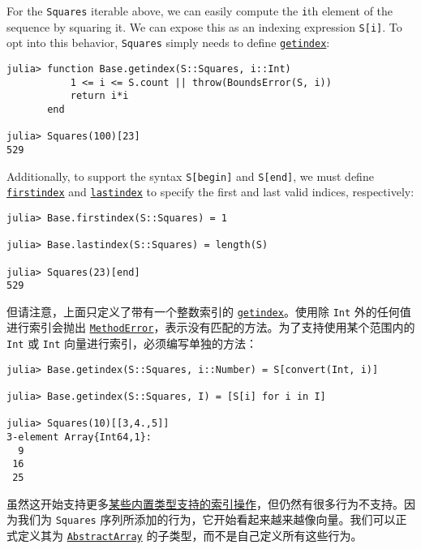 For the \texttt{Squares} iterable above, we can easily compute the \texttt{i}th element of the sequence by squaring it.  We can expose this as an indexing expression \texttt{S[i]}. To opt into this behavior, \texttt{Squares} simply needs to define \hyperlink{13720608614876840481}{\texttt{getindex}}:




\begin{verbatim}
julia> function Base.getindex(S::Squares, i::Int)
           1 <= i <= S.count || throw(BoundsError(S, i))
           return i*i
       end

julia> Squares(100)[23]
529
\end{verbatim}



Additionally, to support the syntax \texttt{S[begin]} and \texttt{S[end]}, we must define \hyperlink{16943669671291374223}{\texttt{firstindex}} and \hyperlink{15780929618270241785}{\texttt{lastindex}} to specify the first and last valid indices, respectively:




\begin{verbatim}
julia> Base.firstindex(S::Squares) = 1

julia> Base.lastindex(S::Squares) = length(S)

julia> Squares(23)[end]
529
\end{verbatim}



但请注意，上面只定义了带有一个整数索引的 \hyperlink{13720608614876840481}{\texttt{getindex}}。使用除 \texttt{Int} 外的任何值进行索引会抛出 \hyperlink{68769522931907606}{\texttt{MethodError}}，表示没有匹配的方法。为了支持使用某个范围内的 \texttt{Int} 或 \texttt{Int} 向量进行索引，必须编写单独的方法：




\begin{verbatim}
julia> Base.getindex(S::Squares, i::Number) = S[convert(Int, i)]

julia> Base.getindex(S::Squares, I) = [S[i] for i in I]

julia> Squares(10)[[3,4.,5]]
3-element Array{Int64,1}:
  9
 16
 25
\end{verbatim}



虽然这开始支持更多\hyperlink{16717190941363337071}{某些内置类型支持的索引操作}，但仍然有很多行为不支持。因为我们为 \texttt{Squares} 序列所添加的行为，它开始看起来越来越像向量。我们可以正式定义其为 \hyperlink{6514416309183787338}{\texttt{AbstractArray}} 的子类型，而不是自己定义所有这些行为。



